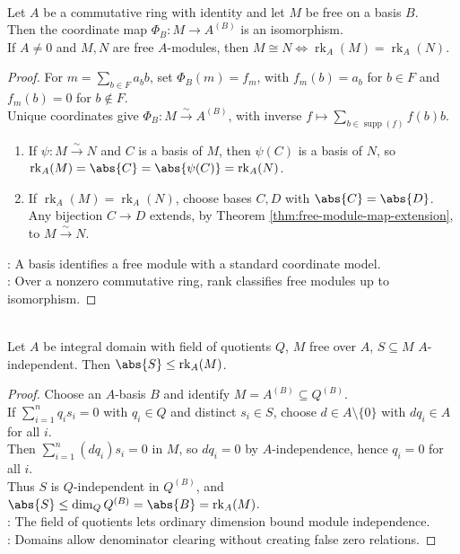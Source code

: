 \begin{proposition} \label{prop:free-module-coordinate-model-and-isomorphism} \\
Let $A$ be a commutative ring with identity and let $M$ be free on a basis $B$.\\
Then the coordinate map $\Phi_B:M\to A^{(B)}$ is an isomorphism.\\
If $A\neq0$ and $M,N$ are free $A$-modules, then $M\cong N\Longleftrightarrow \operatorname{rk}_A(M)=\operatorname{rk}_A(N)$.
\begin{proof} For $m=\sum\limits_{b\in F}a_bb$, set $\Phi_B(m)=f_m$, with $f_m(b)=a_b$ for $b\in F$ and $f_m(b)=0$ for $b\notin F$.\\
Unique coordinates give $\Phi_B:M\xrightarrow{\sim}A^{(B)}$, with inverse $f\mapsto\sum\limits_{b\in\operatorname{supp}(f)}f(b)b$.
\begin{enumerate}[label=\roman*.]
\setlength{\itemsep}{0pt}
\item[$(\Rightarrow)$] If $\psi:M\xrightarrow{\sim}N$ and $C$ is a basis of $M$, then $\psi(C)$ is a basis of $N$, so $\operatorname{rk}_A(M)=\abs{C}=\abs{\psi(C)}=\operatorname{rk}_A(N)$.
\item[$(\Leftarrow)$] If $\operatorname{rk}_A(M)=\operatorname{rk}_A(N)$, choose bases $C,D$ with $\abs{C}=\abs{D}$.\\
Any bijection $C\to D$ extends, by Theorem \ref{thm:free-module-map-extension}, to $M\xrightarrow{\sim}N$.
\end{enumerate}
\noindent
{}: A basis identifies a free module with a standard coordinate model.\\
: Over a nonzero commutative ring, rank classifies free modules up to isomorphism.
\end{proof}
\end{proposition}

\begin{theorem} \label{thm:independent-sets-bounded-by-free-rank-domain} \\
Let $A$ be integral domain with field of quotients $Q$, $M$ free over $A$, $S\subseteq M$ $A$-independent. Then $\abs{S}\leq\operatorname{rk}_A(M)$.
\begin{proof}
Choose an $A$-basis $B$ and identify $M=A^{(B)}\subseteq Q^{(B)}$.\\
If $\sum\limits_{i=1}^{n}q_is_i=0$ with $q_i\in Q$ and distinct $s_i\in S$, choose $d\in A\setminus\{0\}$ with $dq_i\in A$ for all $i$.\\
Then $\sum\limits_{i=1}^{n}(dq_i)s_i=0$ in $M$, so $dq_i=0$ by $A$-independence, hence $q_i=0$ for all $i$.\\
Thus $S$ is $Q$-independent in $Q^{(B)}$, and $\abs{S}\leq\dim_Q Q^{(B)}=\abs{B}=\operatorname{rk}_A(M)$.\\
: The field of quotients lets ordinary dimension bound module independence.\\
: Domains allow denominator clearing without creating false zero relations.
\end{proof}
\end{theorem}

